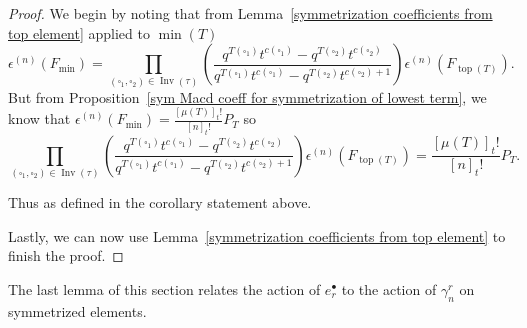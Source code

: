 \documentclass[10pt,a4paper]{amsart}
\numberwithin{equation}{section}
\theoremstyle{definition}
\DeclareMathOperator{\Inv}{\mathrm{Inv}}
\DeclareMathOperator{\Top}{\mathrm{top}}
\DeclareMathOperator{\Min}{\mathrm{min}}
\begin{document}
\begin{proof}
 We begin by noting that from Lemma~\ref{symmetrization coefficients from top element} applied to $\Min(T)$
 \[
 \epsilon^{(n)}(F_{\Min}) = \prod_{(\square_1,\square_2) \in \Inv(\tau)} \left( \frac{q^{T(\square_1)}t^{c(\square_1)} - q^{T(\square_2)}t^{c(\square_2) }}{q^{T(\square_1)}t^{c(\square_1)} - q^{T(\square_2)}t^{c(\square_2) +1}} \right) \epsilon^{(n)}(F_{\Top(T)}).
 \]
 But from Proposition~\ref{sym Macd coeff for symmetrization of lowest term}, we know that $\epsilon^{(n)}(F_{\Min}) = \frac{[\mu(T)]_{t}!}{[n]_{t}!} P_T$ so
 \[
 \prod_{(\square_1,\square_2) \in \Inv(\tau)} \left( \frac{q^{T(\square_1)}t^{c(\square_1)} - q^{T(\square_2)}t^{c(\square_2) }}{q^{T(\square_1)}t^{c(\square_1)} - q^{T(\square_2)}t^{c(\square_2) +1}} \right) \epsilon^{(n)}(F_{\Top(T)}) = \frac{[\mu(T)]_{t}!}{[n]_{t}!} P_T.
 \]

 Thus
\smash{$
 \epsilon^{(n)}(F_{\Top(T)}) = K_T(q,t) P_T
$}
 as defined in the corollary statement above.

 Lastly, we can now use Lemma~\ref{symmetrization coefficients from top element} to finish the proof.
\end{proof}

The last lemma of this section relates the action of $e_r^{\bullet}$ to the action of $\gamma_n^{r}$ on symmetrized elements.
\end{document}

